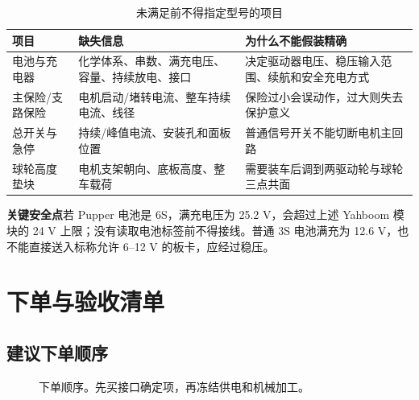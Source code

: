 \documentclass[UTF8,a4paper,zihao=-4,fontset=none]{ctexart}
\newcommand{\warn}[2]{\par\smallskip\noindent\colorbox{Warm}{\parbox{\dimexpr\linewidth-2\fboxsep\relax}{\small\textbf{\color{Amber}#1}\quad #2}}\par\smallskip}
\begin{document}
\begin{table}[H]\small
\caption{未满足前不得指定型号的项目}
\begin{tabularx}{\linewidth}{@{}L{3.2cm}Y Y@{}}\toprule
\textbf{项目} & \textbf{缺失信息} & \textbf{为什么不能假装精确}\\\midrule
电池与充电器 & 化学体系、串数、满充电压、容量、持续放电、接口 & 决定驱动器电压、稳压输入范围、续航和安全充电方式\\
主保险/支路保险 & 电机启动/堵转电流、整车持续电流、线径 & 保险过小会误动作，过大则失去保护意义\\
总开关与急停 & 持续/峰值电流、安装孔和面板位置 & 普通信号开关不能切断电机主回路\\
球轮高度垫块 & 电机支架朝向、底板高度、整车载荷 & 需要装车后调到两驱动轮与球轮三点共面\\\bottomrule
\end{tabularx}
\end{table}

\warn{关键安全点}{若 Pupper 电池是 6S，满充电压为 25.2 V，会超过上述 Yahboom 模块的 24 V 上限；没有读取电池标签前不得接线。普通 3S 电池满充为 12.6 V，也不能直接送入标称允许 6--12 V 的板卡，应经过稳压。}

\section{下单与验收清单}

\subsection{建议下单顺序}

\begin{figure}[H]\centering
{}
\caption{下单顺序。先买接口确定项，再冻结供电和机械加工。}
\end{figure}
\end{document}
